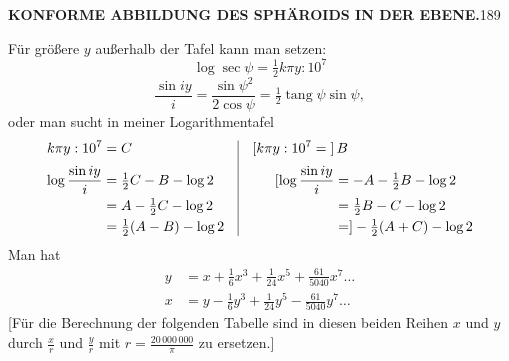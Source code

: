 \par\clearpage
\noindent\null\hfill{\small\textbf{KONFORME ABBILDUNG DES SPHÄROIDS IN DER EBENE.}}\hfill189\par\medskip
Für größere \(y\) außerhalb der Tafel kann man setzen:
\[\log\sec\psi=\tfrac12k\pi y:10^7\]
\[\frac{\sin iy}{i}=\frac{\sin\psi^2}{2\cos\psi}=\tfrac12\operatorname{tang}\psi\sin\psi,\]
\noindent oder man sucht in meiner Logarithmentafel
\[
\begin{array}{@{}r@{\quad}|@{\quad}l@{}}
\begin{aligned}
k\pi y:10^7&=C\\[3pt]
\log\frac{\sin iy}{i}&=\tfrac12C-B-\log2\\
&=A-\tfrac12C-\log2\\
&=\tfrac12(A-B)-\log2
\end{aligned}
&\begin{aligned}
\mathopen{[}k\pi y:10^7={}]&\,B\\[3pt]
[\log\frac{\sin iy}{i}&=-A-\tfrac12B-\log2\\
&=\tfrac12B-C-\log2\\
&=]-\tfrac12(A+C)-\log2
\end{aligned}
\end{array}
\]
Man hat
\[
\begin{aligned}
y&=x+\tfrac16x^3+\tfrac1{24}x^5+\tfrac{61}{5040}x^7\ldots\\
x&=y-\tfrac16y^3+\tfrac1{24}y^5-\tfrac{61}{5040}y^7\ldots
\end{aligned}
\]
[Für die Berechnung der folgenden Tabelle sind in diesen beiden Reihen \(x\) und \(y\) durch \(\frac{x}{r}\) und \(\frac{y}{r}\) mit \(r=\frac{20\,000\,000}{\pi}\) zu ersetzen.]
